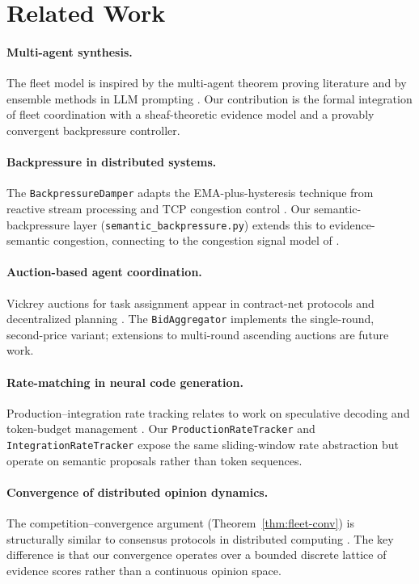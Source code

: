 \documentclass[11pt]{article}
\providecommand{\AggPY}{\texttt{BidAggregator}}
\providecommand{\DamperPY}{\texttt{BackpressureDamper}}
\providecommand{\ProdPY}{\texttt{ProductionRateTracker}}
\providecommand{\IntPY}{\texttt{IntegrationRateTracker}}
\begin{document}
\section{Related Work}\label{sec:related}

\paragraph{Multi-agent synthesis.}
The fleet model is inspired by the multi-agent theorem proving literature
\cite{rawson2019,tambet2021} and by ensemble methods in LLM prompting
\cite{wang2022self}.  Our contribution is the formal integration of fleet
coordination with a sheaf-theoretic evidence model and a provably convergent
backpressure controller.

\paragraph{Backpressure in distributed systems.}
The \DamperPY{} adapts the EMA-plus-hysteresis technique from reactive
stream processing \cite{akka2022} and TCP congestion control \cite{jacobson88}.
Our semantic-backpressure layer (\texttt{semantic\_backpressure.py}) extends
this to evidence-semantic congestion, connecting to the congestion signal model
of \cite{backstrom2023}.

\paragraph{Auction-based agent coordination.}
Vickrey auctions for task assignment appear in contract-net protocols
\cite{smith80} and decentralized planning \cite{yin2013}.  The \AggPY{}
implements the single-round, second-price variant; extensions to
multi-round ascending auctions are future work.

\paragraph{Rate-matching in neural code generation.}
Production--integration rate tracking relates to work on speculative decoding
\cite{chen2023speculative} and token-budget management \cite{wu2024}.
Our \ProdPY{} and \IntPY{} expose the same sliding-window rate abstraction
but operate on semantic proposals rather than token sequences.

\paragraph{Convergence of distributed opinion dynamics.}
The competition--convergence argument (Theorem~\ref{thm:fleet-conv}) is
structurally similar to consensus protocols in distributed computing
\cite{degroot1974,vicsek1995}.  The key difference is that our convergence
operates over a bounded discrete lattice of evidence scores rather than a
continuous opinion space.
\end{document}
